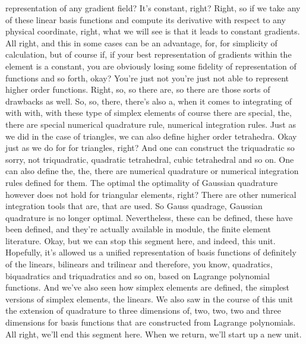 \documentclass[10pt]{article}
\begin{document}
representation of any gradient field? It's constant, right? Right, so if we take any of these linear basis functions and compute its derivative with respect to any physical coordinate, right, what we will see is that it leads to constant gradients. All right, and this in some cases can be an advantage, for, for simplicity of calculation, but of course if, if your best representation of gradients within the element is a constant, you are obviously losing some fidelity of representation of functions and so forth, okay? You're just not you're just not able to represent higher order functions. Right, so, so there are, so there are those sorts of drawbacks as well. So, so, there, there's also a, when it comes to integrating of with with, with these type of simplex elements of course there are special, the, there are special numerical quadrature rule, numerical integration rules. Just as we did in the case of triangles, we can also define higher order tetrahedra. Okay just as we do for for triangles, right? And one can construct the triquadratic so sorry, not triquadratic, quadratic tetrahedral, cubic tetrahedral and so on. One can also define the, the, there are numerical quadrature or numerical integration rules defined for them. The optimal the optimality of Gaussian quadrature however does not hold for triangular elements, right? There are other numerical integration tools that are, that are used. So Gauss quadrage, Gaussian quadrature is no longer optimal. Nevertheless, these can be defined, these have been defined, and they're actually  available in module, the finite element literature. Okay, but we can stop this segment here, and indeed, this unit. Hopefully, it's allowed us a unified representation of basis functions of definitely of the linears, bilinears and trilinear and therefore, you know, quadratics, biquadratics and triquadratics and so on, based on Lagrange polynomial functions. And we've also seen how simplex elements are defined, the simplest versions of simplex elements, the linears. We also saw in the course of this unit the extension of quadrature to three dimensions of, two, two, two and three dimensions for basis functions that are constructed from Lagrange polynomials. All right, we'll end this segment here. When we return, we'll start up a new unit.
\end{document}
